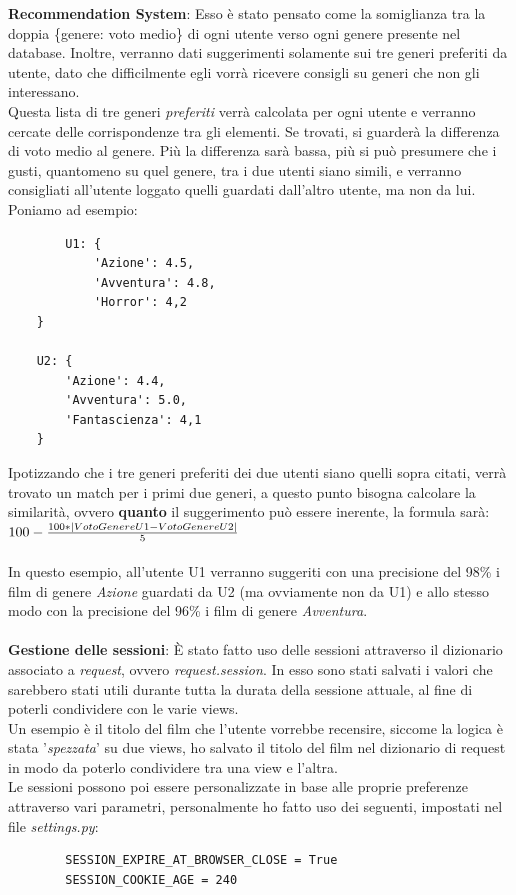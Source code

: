 \documentclass[12pt]{article}
\begin{document}
	\noindent \textbf{Recommendation System}: Esso è stato pensato come la somiglianza tra la doppia \{genere: voto medio\} di ogni utente verso ogni genere presente nel database.
	Inoltre, verranno dati suggerimenti solamente sui tre generi preferiti da utente, dato che difficilmente egli vorrà ricevere consigli su generi che non gli interessano. \\Questa lista di tre generi \textit{preferiti} verrà calcolata per ogni utente e verranno cercate delle corrispondenze tra gli elementi. Se trovati, si guarderà la differenza di voto medio al genere. Più la differenza sarà bassa, più si può presumere che i gusti, quantomeno su quel genere, tra i due utenti siano simili, e verranno consigliati all'utente loggato quelli guardati dall'altro utente, ma non da lui. \\
	Poniamo ad esempio:
	\begin{verbatim}
		U1: {
			'Azione': 4.5,
			'Avventura': 4.8,
			'Horror': 4,2
	}

	U2: {
		'Azione': 4.4,
		'Avventura': 5.0,
		'Fantascienza': 4,1
	}
	\end{verbatim}

	\noindent Ipotizzando che i tre generi preferiti dei due utenti siano quelli sopra citati, verrà trovato un match per i primi due generi, a questo punto bisogna calcolare la similarità, ovvero \textbf{quanto} il suggerimento può essere inerente, la formula sarà: \\
	
	$100 - {100 * |VotoGenereU1-VotoGenereU2| \over 5}$ \\ \\
	
	\noindent In questo esempio, all'utente U1 verranno suggeriti con una precisione del 98\% i film di genere \textit{Azione} guardati da U2 (ma ovviamente non da U1) e allo stesso modo con la precisione del 96\% i film di genere \textit{Avventura}. \\ \\
	
	\noindent \textbf{Gestione delle sessioni}: È stato fatto uso delle sessioni attraverso il dizionario associato a \textit{request}, ovvero \textit{request.session}. In esso sono stati salvati i valori che sarebbero stati utili durante tutta la durata della sessione attuale, al fine di poterli condividere con le varie views. \\
	Un esempio è il titolo del film che l'utente vorrebbe recensire, siccome la logica è stata '\textit{spezzata}' su due views, ho salvato il titolo del film nel dizionario di request in modo da poterlo condividere tra una view e l'altra. \\
	Le sessioni possono poi essere personalizzate in base alle proprie preferenze attraverso vari parametri, personalmente ho fatto uso dei seguenti, impostati nel file \textit{settings.py}:
	\begin{verbatim}
		SESSION_EXPIRE_AT_BROWSER_CLOSE = True
		SESSION_COOKIE_AGE = 240
	\end{verbatim}
	
\end{document}
